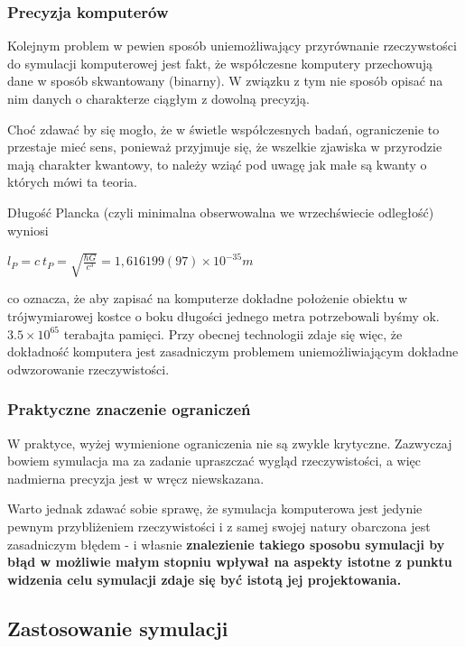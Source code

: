 \subsubsection{Precyzja komputerów}
\par{
Kolejnym problem w pewien sposób uniemożliwający przyrównanie rzeczywstości do symulacji komputerowej jest fakt, że współczesne komputery przechowują dane w sposób skwantowany (binarny). W związku z tym nie sposób opisać na nim danych o charakterze ciągłym z dowolną precyzją.
}
\par{
Choć zdawać by się mogło, że w świetle współczesnych badań, ograniczenie to przestaje mieć sens, ponieważ przyjmuje się, że wszelkie zjawiska w przyrodzie mają charakter kwantowy, to należy wziąć pod uwagę jak małe są kwanty o których mówi ta teoria.
}
\par{
Długość Plancka (czyli minimalna obserwowalna we wrzechświecie odległość) wyniosi 
\begin{center}
$l_P = c \ t_P = \sqrt{\frac{\hbar G}{c^3}} = 1,616 199(97) \times 10^{-35} m$
\end{center}
co oznacza, że aby zapisać na komputerze dokładne położenie obiektu w trójwymiarowej kostce o boku długości jednego metra potrzebowali byśmy ok. $3.5 \times 10^{65}$ terabajta pamięci. Przy obecnej technologii zdaje się więc, że dokładność komputera jest zasadniczym problemem uniemożliwiającym dokładne odwzorowanie rzeczywistości.
}

\subsubsection{Praktyczne znaczenie ograniczeń}
\par{
W praktyce, wyżej wymienione ograniczenia nie są zwykle krytyczne. Zazwyczaj bowiem symulacja ma za zadanie upraszczać wygląd rzeczywistości, a więc nadmierna precyzja jest w wręcz niewskazana.
}
\par{
Warto jednak zdawać sobie sprawę, że symulacja komputerowa jest jedynie pewnym przybliżeniem rzeczywistości i z samej swojej natury obarczona jest zasadniczym błędem - i własnie \textbf{znalezienie takiego sposobu symulacji by błąd w możliwie małym stopniu wpływał na aspekty istotne z punktu widzenia celu symulacji zdaje się być istotą jej projektowania.}
}

\subsection{Zastosowanie symulacji}

